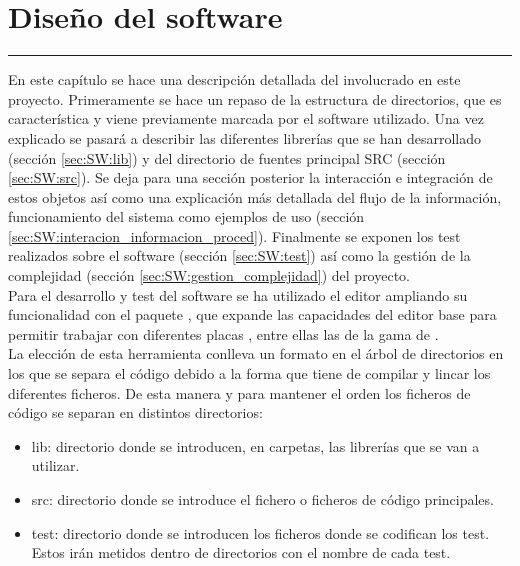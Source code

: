 \chapter{Diseño del software} \label{chap:SW}
\hrule
\vspace{3mm}

    En este capítulo se hace una descripción detallada del  involucrado en este proyecto. Primeramente se hace un repaso de la estructura de directorios, que es característica y viene previamente marcada por el software utilizado. Una vez explicado se pasará a describir las diferentes librerías que se han desarrollado (sección \ref{sec:SW:lib}) y del directorio de fuentes principal SRC (sección \ref{sec:SW:src}). Se deja para una sección posterior la interacción e integración de estos objetos así como una explicación más detallada del flujo de la información, funcionamiento del sistema como ejemplos de uso (sección \ref{sec:SW:interacion_informacion_proced}). Finalmente se exponen los test realizados sobre el software (sección \ref{sec:SW:test}) así como la gestión de la complejidad (sección \ref{sec:SW:gestion_complejidad}) del proyecto.
    \\

    Para el desarrollo y test del software se ha utilizado el editor  ampliando su funcionalidad con el paquete , que expande las capacidades del editor base para permitir trabajar con diferentes placas \completar, entre ellas las de la gama de .
    \\

    La elección de esta herramienta conlleva un formato en el árbol de directorios en los que se separa el código debido a la forma que tiene de compilar y lincar los diferentes ficheros. De esta manera y para mantener el orden los ficheros de código se separan en distintos directorios:

    \begin{itemize}
    	\item lib: directorio donde se introducen, en carpetas, las librerías que se van a utilizar.
    	\item src: directorio donde se introduce el fichero o ficheros de código principales.
    	\item test: directorio donde se introducen los ficheros donde se codifican los test. Estos irán metidos dentro de directorios con el nombre de cada test.
    \end{itemize}

